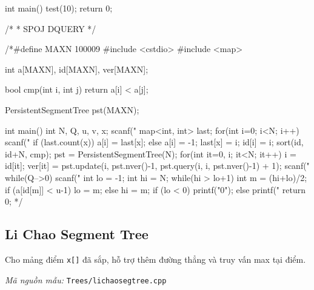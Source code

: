 \documentclass[11pt]{article}
\newcommand{\codepath}[1]{\par\noindent\textit{Mã nguồn mẫu:} \texttt{#1}\par}
\begin{document}
\begin{vncode}
int main() {
	test(10);
	return 0;
}

/*
 * SPOJ DQUERY
 */

/*#define MAXN 100009
#include <cstdio>
#include <map>

int a[MAXN], id[MAXN], ver[MAXN];

bool cmp(int i, int j) {
	return a[i] < a[j];
}

PersistentSegmentTree pst(MAXN);

int main() {
	int N, Q, u, v, x;
	scanf("%
	map<int, int> last;
	for(int i=0; i<N; i++) {
		scanf("%
		if (last.count(x)) a[i] = last[x];
		else a[i] = -1;
		last[x] = i;
		id[i] = i;
	}
	sort(id, id+N, cmp);
	pst = PersistentSegmentTree(N);
	for(int it=0, i; it<N; it++) {
		i = id[it];
		ver[it] = pst.update(i, pst.nver()-1, pst.query(i, i, pst.nver()-1) + 1);
	}
	scanf("%
	while(Q-->0) {
		scanf("%
		int lo = -1;
		int hi = N;
		while(hi > lo+1) {
			int m = (hi+lo)/2;
			if (a[id[m]] < u-1) lo = m;
			else hi = m;
		}
		if (lo < 0) printf("0\n");
		else printf("%
	}
	return 0;
}*/
\end{vncode}
\endgroup


\subsection{Li Chao Segment Tree}

Cho mảng điểm \texttt{x[]} đã sắp, hỗ trợ thêm đường thẳng và truy vấn max tại điểm.

\codepath{Trees/lichaosegtree.cpp}
\end{document}
